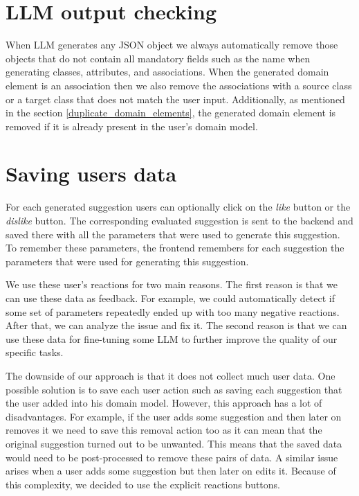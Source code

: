 \section{LLM output checking}

When LLM generates any JSON object we always automatically remove those objects that do not contain all mandatory fields such as the name when generating classes, attributes, and associations. When the generated domain element is an association then we also remove the associations with a source class or a target class that does not match the user input. Additionally, as mentioned in the section \ref{duplicate_domain_elements}, the generated domain element is removed if it is already present in the user's domain model.


\section{Saving users data}

For each generated suggestion users can optionally click on the \textit{like} button or the \textit{dislike} button. The corresponding evaluated suggestion is sent to the backend and saved there with all the parameters that were used to generate this suggestion. To remember these parameters, the frontend remembers for each suggestion the parameters that were used for generating this suggestion.

We use these user's reactions for two main reasons. The first reason is that we can use these data as feedback. For example, we could automatically detect if some set of parameters repeatedly ended up with too many negative reactions. After that, we can analyze the issue and fix it. The second reason is that we can use these data for fine-tuning some LLM to further improve the quality of our specific tasks.

The downside of our approach is that it does not collect much user data. One possible solution is to save each user action such as saving each suggestion that the user added into his domain model. However, this approach has a lot of disadvantages. For example, if the user adds some suggestion and then later on removes it we need to save this removal action too as it can mean that the original suggestion turned out to be unwanted. This means that the saved data would need to be post-processed to remove these pairs of data. A similar issue arises when a user adds some suggestion but then later on edits it. Because of this complexity, we decided to use the explicit reactions buttons.



